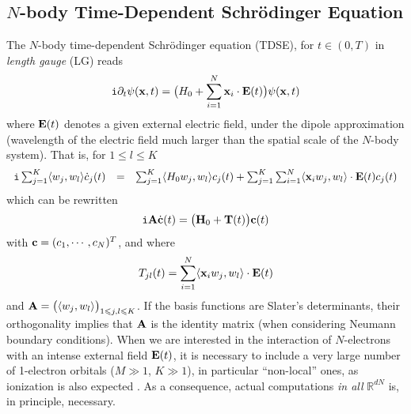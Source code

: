 \documentclass[11pt]{elsarticle}
\let \leq \leqslant
\newcommand{\R} {\ensuremath{\mathbb{R}}}
\begin{document}
\subsection{$N$-body Time-Dependent Schr\"odinger Equation}\label{TDSE}
The $N$-body time-dependent Schr\"odinger equation (TDSE), for $t \in (0,T)$ in {\it length gauge} (LG) \cite{gauge} reads
\begin{eqnarray}\label{LG}
{\tt i}\partial_t \psi({\bf x},t) = \big(H_0 + \sum_{i=1}^N{\bf x}_i\cdot {\bf E}(t) \big)\psi({\bf x},t)
\end{eqnarray}
where ${\bf E}(t)$ denotes a given external electric field, under the dipole approximation (wavelength of the electric field much larger than the spatial scale of the $N$-body system).
That is, for $1 \leq l\leq K$
\begin{eqnarray*}
\left.
\begin{array}{lcl}
{\tt i}\sum_{j=1}^K\langle w_j,w_l\rangle\dot c_j(t) & = & \sum_{j=1}^K\langle H_0 w_j,w_l\rangle c_j(t) + \sum_{j=1}^K\sum_{i=1}^N\langle {\bf x}_i w_j,w_l\rangle \cdot {\bf E}(t) c_j(t)
\end{array}
\right.
\end{eqnarray*}
which can be rewritten
\begin{eqnarray*}
{\tt i}{\bf A}\dot{\bf c}(t) = \big({\bf H}_0 + {\bf T}(t)\big){\bf c}(t)
\end{eqnarray*}
with ${\bf c}=(c_1,\cdots,c_N)^T$, and where 
\begin{eqnarray*}
T_{jl}(t) = \sum_{i=1}^N\langle  {\bf x}_i w_j,w_l\rangle \cdot {\bf E}(t)
\end{eqnarray*}
and ${\bf A}=\big(\langle w_j,w_l\rangle\big)_{1\leq j,l \leq K}$. If the basis functions are Slater's determinants, their orthogonality implies that ${\bf A}$ is the identity matrix (when considering Neumann boundary conditions). When we are interested in the interaction of $N$-electrons with an intense external field ${\bf E}(t)$, it is necessary to include a very large number of 1-electron orbitals ($M \gg 1$, $K \gg 1$), in particular ``non-local'' ones, as ionization is also expected \cite{PBC,AB12}. As a consequence, actual computations {\it in all} $\R^{dN}$ is, in principle, necessary. 
\end{document}
